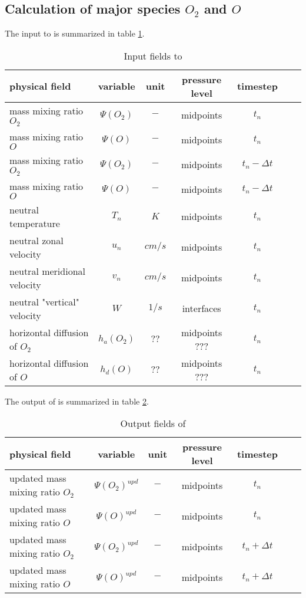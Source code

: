 \subsection{Calculation of major species  $O_2$ and $O$}\label{subcap:comp}
%
The input to  is summarized in table
\ref{tab:input_comp}.
%
\begin{table}[tb]
\begin{tabular}{|p{3.5cm} ||c|c|c|c|c|c|} \hline
physical field               & variable        & unit&pressure
level& timestep
\\ \hline \hline
%
mass mixing ratio $O_2$ &       $\Psi(O_2)$              & $-$   &  midpoints & $t_n$\\
mass mixing ratio $O$ &         $\Psi(O  )$              & $-$   &  midpoints & $t_n$\\
mass mixing ratio $O_2$ &       $\Psi(O_2)$              & $-$   &  midpoints & $t_n-\Delta t$\\
mass mixing ratio $O$ &         $\Psi(O  )$              & $-$   &  midpoints & $t_n- \Delta t$\\
neutral temperature &        $T_n$              & $K$   &  midpoints & $t_n$\\
neutral zonal velocity &       $u_n$              & $cm/s$   &  midpoints & $t_n$\\
neutral meridional velocity &       $v_n$              & $cm/s$   &  midpoints & $t_n$\\
neutral "vertical" velocity &       $W$              & $1/s$   &  interfaces & $t_n$\\
horizontal diffusion of $O_2$ &       $h_a(O_2)$              & $??$   &  midpoints ??? & $t_n$\\
horizontal diffusion of $O$ &       $h_d(O)$              & $??$ &
midpoints ??? & $t_n$
 \\ \hline
\end{tabular}
\caption{Input fields to }
\label{tab:input_comp}
\end{table}
%
The output of  is summarized in table
\ref{tab:output_comp}.
%
\begin{table}[tb]
\begin{tabular}{|p{3.5cm} ||c|c|c|c|c|c|} \hline
physical field               & variable        & unit&pressure
level& timestep \\ \hline \hline
updated mass mixing ratio $O_2$ &       $\Psi(O_2)^{upd}$              & $-$   &  midpoints & $t_n$\\
updated mass mixing ratio $O$ &         $\Psi(O  )^{upd}$              & $-$   &  midpoints & $t_n$\\
updated mass mixing ratio $O_2$ &       $\Psi(O_2)^{upd}$              & $-$   &  midpoints & $t_n+\Delta t$\\
updated mass mixing ratio $O$ &         $\Psi(O  )^{upd}$ & $-$   &
midpoints & $t_n+ \Delta t$
\\ \hline \hline
\end{tabular}
\caption{Output fields of }
\label{tab:output_comp}
\end{table}
